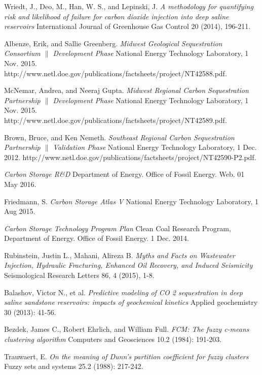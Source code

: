 \documentclass[letterpaper, 12pt]{article}
\begin{document}
\begin{thebibliography}{9}

Wriedt, J., Deo, M., Han, W. S., and Lepinski, J.
\textit{A methodology for quantifying risk and likelihood of failure for carbon dioxide injection into deep saline reservoirs}
International Journal of Greenhouse Gas Control 20 (2014), 196-211.

Albenze, Erik, and Sallie Greenberg. 
\textit{Midwest Geological Sequestration Consortium $\|$ Development Phase}
National Energy Technology Laboratory, 1 Nov. 2015. http://www.netl.doe.gov/publications/factsheets/project/NT42588.pdf.

McNemar, Andrea, and Neeraj Gupta. 
\textit{Midwest Regional Carbon Sequestration Partnership $\|$ Development Phase}
National Energy Technology Laboratory, 1 Nov. 2015. http://www.netl.doe.gov/publications/factsheets/project/NT42589.pdf.

Brown, Bruce, and Ken Nemeth. 
\textit{Southeast Regional Carbon Sequestration Partnership $\|$ Validation Phase}
National Energy Technology Laboratory, 1 Dec. 2012. http://www.netl.doe.gov/publications/factsheets/project/NT42590-P2.pdf.

\textit{Carbon Storage R\&D} Department of Energy. Office of Fossil Energy. Web. 01 May 2016.

Friedmann, S. 
\textit{Carbon Storage Atlas V} 
National Energy Technology Laboratory, 1 Aug 2015.

\textit{Carbon Storage Technology Program Plan}
Clean Coal Research Program, Department of Energy. Office of Fossil Energy. 1 Dec. 2014.

Rubinstein, Justin L., Mahani, Alireza B.
\textit{Myths and Facts on Wastewater Injection, Hydraulic Fracturing, Enhanced Oil Recovery, and Induced Seismicity}
Seismological Research Letters 86, 4 (2015), 1-8. 

Balashov, Victor N., et al.
\textit{Predictive modeling of CO 2 sequestration in deep saline sandstone reservoirs: impacts of geochemical kinetics}
Applied geochemistry 30 (2013): 41-56.

Bezdek, James C., Robert Ehrlich, and William Full.
\textit{FCM: The fuzzy c-means clustering algorithm}
Computers and Geosciences 10.2 (1984): 191-203.

Trauwaert, E. 
\textit{On the meaning of Dunn's partition coefficient for fuzzy clusters}
Fuzzy sets and systems 25.2 (1988): 217-242.

\end{thebibliography}
\end{document}
